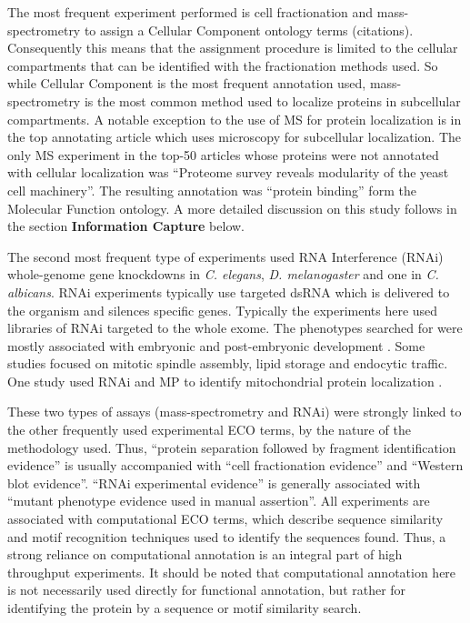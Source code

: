 \documentclass[12pt]{article}
\begin{document}
The most frequent experiment performed is cell fractionation and mass-spectrometry to
assign a Cellular Component ontology terms (citations).  Consequently this means that the
assignment procedure is limited to the cellular compartments that can be identified with
the fractionation methods used\cite{MS-articles}. So while Cellular Component is the most
frequent annotation used, mass-spectrometry is the most common method used to localize
proteins in subcellular compartments. A notable exception to the use of MS for protein
localization is in the top annotating article \cite{pmid18029348} which uses microscopy for
subcellular localization. The only MS experiment in the top-50 articles whose proteins were
not annotated with cellular localization was ``Proteome survey reveals modularity of the
yeast cell machinery''\cite{pmid18029348}. The resulting annotation was ``protein binding''
form the Molecular Function ontology. A more detailed discussion on this study follows in
the section \textbf{Information Capture} below.

The second most frequent type of experiments used RNA Interference (RNAi) whole-genome gene
knockdowns in \textit{C. elegans}, \textit{D. melanogaster} and one in \textit{C. albicans}.
RNAi experiments typically use targeted dsRNA which is delivered to the organism and silences
specific genes. Typically the experiments here used libraries of RNAi targeted to the whole
exome. The phenotypes searched for were mostly associated with embryonic and post-embryonic
development \cite{relevant articles}. Some studies focused on mitotic spindle
assembly\cite{pmid17412918}, lipid storage\cite{pmid17412918} and endocytic
traffic\cite{pmid17412918}. One study used RNAi and MP to identify mitochondrial protein
localization \cite{pmid18433294}.

These two types of assays (mass-spectrometry and RNAi)  were strongly linked to the other
frequently used experimental ECO terms, by the nature of the methodology used. Thus, ``protein
separation followed by fragment identification evidence'' is usually accompanied with ``cell
fractionation evidence'' and ``Western blot evidence''. ``RNAi experimental evidence'' is
generally associated with ``mutant phenotype evidence used in manual assertion''. All experiments
are associated with computational ECO terms, which describe sequence similarity and motif
recognition techniques used to identify the sequences found. Thus, a strong reliance on
computational annotation is an integral part of high throughput experiments. It should be noted
that computational annotation here is not necessarily used directly for functional annotation,
but rather for identifying the protein by a sequence or motif similarity search.
\end{document}
